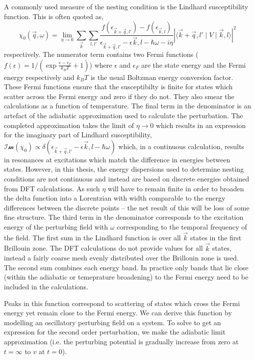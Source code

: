 A commonly used measure of the nesting condition is the Lindhard susceptibility function. This is often quoted as,
\begin{equation}
\chi_0(\vec{q}, \omega) = \lim_{\eta \to 0} \sum_{\vec{k}}\sum_{l,l\prime}\frac{f(\epsilon_{\vec{k}+\vec{q},l\prime}) - f(\epsilon_{\vec{k},l})}{\epsilon_{\vec{k}+\vec{q},l\prime} - \epsilon{\vec{k},l} - \hbar\omega - i\eta}|\langle \vec{k}+\vec{q},l\prime \mid  V \mid \vec{k},l \rangle|^2
\end{equation}
respectively. The numerator term contains two Fermi functions ($f(\epsilon) = 1/(\exp{\frac{\epsilon - \epsilon_F}{k_B T}} + 1)$) where $\epsilon$ and $\epsilon_F$ are the state energy and the Fermi energy respectively and $k_BT$ is the usual Boltzman energy conversion factor. These Fermi functions ensure that the susceptibilty is finite for states which scatter across the Fermi energy and zero if they do not. They also smear the calculations as a function of temperature. The final term in the denominator is an artefact of the adiabatic approximation used to calculate the perturbation. The completed approximation takes the limit of $\eta \to 0$ which results in an expression for the imaginary part of Lindhard susceptibility, $\mathcal{Im}(\chi_0) \propto \delta(\epsilon_{\vec{k}+\vec{q},l\prime} - \epsilon{\vec{k},l} - \hbar\omega)$ which, in a continuous calculation, results in resonances at excitations which match the difference in energies between states. However, in this thesis, the energy dispersions used to determine nesting conditions are not continuous and instead are based on discrete energies obtained from DFT calculations. As such $\eta$ will have to remain finite in order to broaden the delta function into a Lorentzian with width comparable to the energy differences between the discrete points -- the net result of this will be loss of some fine structure. The third term in the denominator corresponds to the excitation energy of the perturbing field with $\omega$ corresponding to the temporal frequency of the field. The first sum in the Lindhard function is over all $\vec{k}$ states in the first Brillouin zone. The DFT calculations do not provide values for all $\vec{k}$ states, instead a fairly coarse mesh evenly distributed over the Brillouin zone is used. The second sum combines each energy band. In practice only bands that lie close (within the adiabatic or temeprature broadening) to the Fermi energy need to be included in the calculations.

Peaks in this function correspond to scattering of states which cross the Fermi energy yet remain close to the Fermi energy.  We can derive this function by modelling an oscillatory perturbing field on a system. To solve to get an expression for the second order perturbation, we make the adiabatic limit approximation (i.e. the perturbing potential is gradually increase from zero at $t=\infty$ to $v$ at $t=0$).

